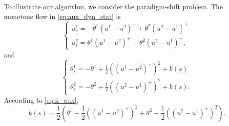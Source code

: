 \documentclass[12pt]{amsart}
\newcommand{\1}{{\chi}}
\newcommand{\lb}{\left(}
\newcommand{\rb}{\right)}
\theoremstyle{definition}
\begin{document}
	
	


 
To illustrate our algorithm, we consider the paradigm-shift problem. The monotone flow in \eqref{eq:aux_dyn_stat} is
                \begin{equation} \label{ums}
                        \begin{cases}
                                u^1_s = -\theta^1(u^1-u^2)^+ +\theta^2 (u^2-u^1)^+\\
                                u^2_s = \theta^1(u^1-u^2)^+ -\theta^2 (u^2-u^1)^+,
                        \end{cases}
                \end{equation}
                and
                \begin{equation} \label{tms}
                        \begin{cases}
                                \theta^1_s = -\theta^1 + \frac{1}{2}((u^1-u^2)^+)^2+k(s)\\
                                \theta^2_s = -\theta^2 + \frac{1}{2}((u^2-u^1)^+)^2+k(s). 
                        \end{cases}
                \end{equation}
                According to   \eqref{eq:k_aux},  
                \begin{equation*}
                        k(s) = \frac{1}{2} \lb \theta^1 - \frac{1}{2}((u^1-u^2)^+)^2
+  \theta^2 - \frac{1}{2}((u^2-u^1)^+)^2 \rb.
                \end{equation*} 
\end{document}
